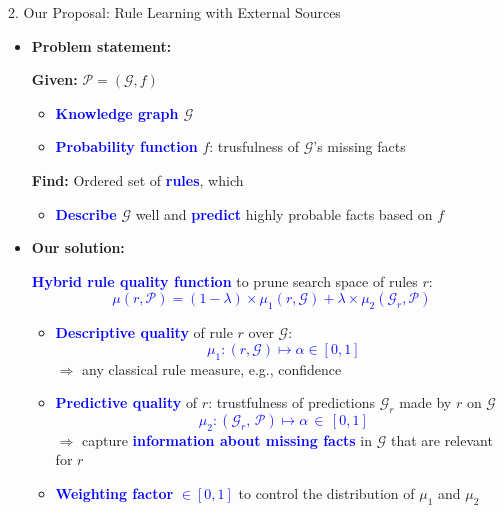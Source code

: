 \documentclass[t,final,hyperref={pdfpagelabels=true}]{beamer}
\def\cG{\ensuremath{\mathcal{G}}}
\newcommand{\bl}[1]{\textcolor{blue}{#1}}
\begin{document}
\begin{frame}
	\begin{columns}[t]
		\begin{column}{.5\textwidth}
			\begin{block}{2. Our Proposal: Rule Learning with External Sources}
\begin{itemize}
\item \textbf{Problem statement:}
\smallskip

\;\;\;\small{\textbf{Given:} $\mathcal{P}=(\cG,f)$
\begin{itemize}
\item \textbf{\bl{Knowledge graph} $\mathcal{G}$}				
\item \textbf{\bl{Probability function}} $f$: trusfulness of $\cG$'s missing facts
\end{itemize}}
\bigskip

\;\;\;\small{\textbf{Find:} Ordered set of \textbf{\bl{rules}}, which  
\begin{itemize}
\item \textbf{\bl{Describe}} $\cG$ well and \textbf{\bl{predict}} highly probable facts based on $f$
\end{itemize}}

\bigskip
\bigskip

\item \normalsize{\textbf{Our solution:}}
\bigskip

\small \bl{\textbf{Hybrid rule quality function}} to prune search space of rules $r$:   
\bl{\[\mu(r,\mathcal{P})= (1 - \lambda) \times \mu_1(r,\cG) + \lambda \times \mu_2(\cG_r,\mathcal{P})\]}
\vspace{-1cm}
						\begin{itemize}
							\item \bl{\textbf{Descriptive quality} } of rule $r$ over $\mathcal{G}$:
							      \bl{\[\mu_1: (r,\cG) \mapsto \alpha \in  [0,1]\]}
							      $\Rightarrow$ any classical rule measure, e.g., confidence
							      \bigskip
							      \bigskip

			\item \bl{\textbf{Predictive quality} } of $r$: trustfulness of predictions $\cG_r$ made by $r$ on $\cG$
							      \bl{\[\mu_2: (\cG_r{,}\, \mathcal{P}) \mapsto  \alpha \,{\in}\, [0,1]\]}
							      $\Rightarrow$ capture \textbf{\bl{information about missing facts}} in $\cG$ that are relevant for $r$
\bigskip

							\item \bl{\textbf{Weighting factor}} \pmb{\bl{$\lambda$}} \bl{$\in [0, 1]$} to control the distribution of $\mu_1$ and $\mu_2$


\end{itemize}
\end{itemize}
\end{block}
\end{column}
\end{columns}
\end{frame}
\end{document}

